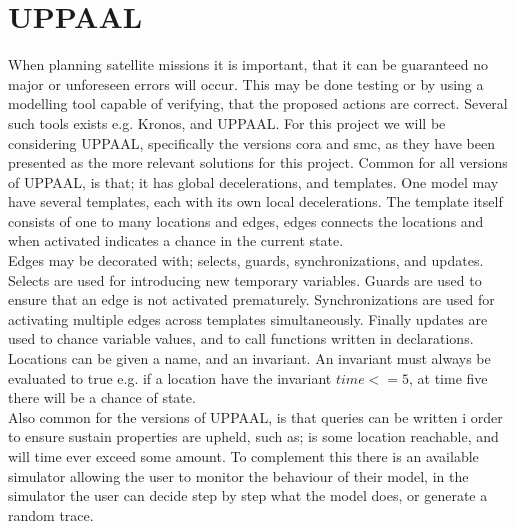 \section{UPPAAL}
When planning satellite missions it is important, that it can be guaranteed no major or unforeseen errors will occur. This may be done testing or by using a modelling tool capable of verifying, that the proposed actions are correct\cite{cs_smc}. Several such tools exists e.g. Kronos, and UPPAAL. For this project we will be considering UPPAAL, specifically the versions \gls{cora} and \gls{smc}, as they have been presented as the more relevant solutions for this project.
Common for all versions of UPPAAL, is that; it has global decelerations, and templates. One model may have several templates, each with its own local decelerations. The template itself consists of one to many locations and edges, edges connects the locations and when activated indicates a chance in the current state.\\
Edges may be decorated with; selects, guards, synchronizations, and updates. Selects are used for introducing new temporary variables. Guards are used to ensure that an edge is not activated prematurely. Synchronizations are used for activating multiple edges across templates simultaneously. Finally updates are used to chance variable values, and to call functions written in declarations.\\
Locations can be given a name, and an invariant. An invariant must always be evaluated to true e.g. if a location have the invariant $time <= 5$, at time five there will be a chance of state.\\
Also common for the versions of UPPAAL, is that queries can be written i order to ensure sustain properties are upheld, such as; is some location reachable, and will time ever exceed some amount. To complement this there is an available simulator allowing the user to monitor the behaviour of their model, in the simulator the user can decide step by step what the model does, or generate a random trace.


